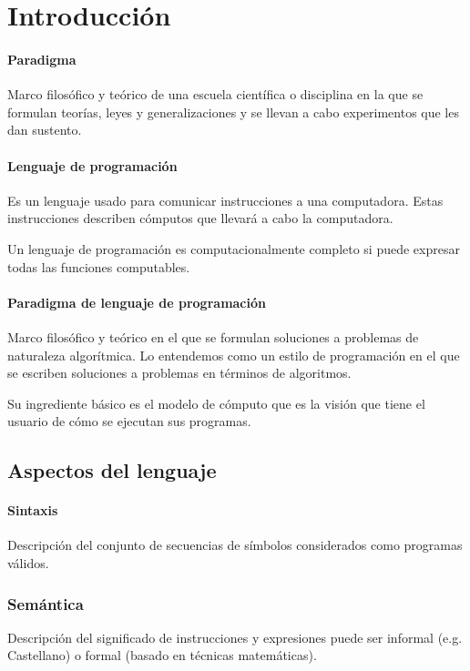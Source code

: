 \section{Introducción}
\paragraph{Paradigma} Marco filosófico y teórico de una escuela científica o disciplina en la que se formulan teorías, leyes y generalizaciones y se llevan a cabo experimentos que les dan sustento.

\paragraph{Lenguaje de programación} Es un lenguaje usado para comunicar instrucciones a una computadora. Estas instrucciones describen cómputos que llevará a cabo la computadora.

Un lenguaje de programación es computacionalmente completo si puede expresar todas las funciones computables.

\paragraph{Paradigma de lenguaje de programación} Marco filosófico y teórico en el que se formulan soluciones a problemas de naturaleza algorítmica. Lo entendemos como un estilo de programación en el que se escriben soluciones a problemas en términos de algoritmos.

Su ingrediente básico es el modelo de cómputo que es la visión que tiene el usuario de cómo se ejecutan sus programas.

\subsection{Aspectos del lenguaje}

\paragraph{Sintaxis} Descripción del conjunto de secuencias de símbolos considerados como programas válidos.

\subsubsection{Semántica}

Descripción del significado de instrucciones y expresiones puede ser informal (e.g. Castellano) o formal (basado en técnicas matemáticas).

